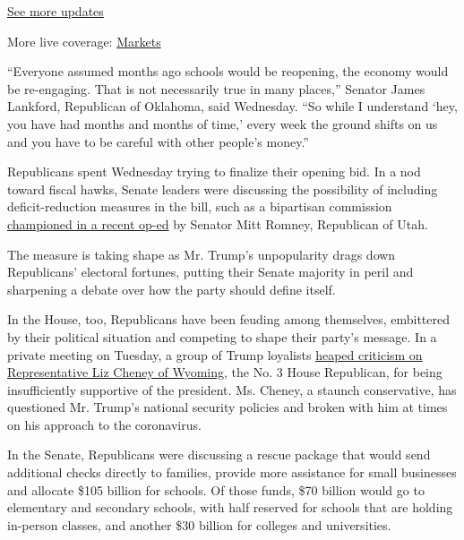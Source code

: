 \href{https://www.nytimes.com/2020/08/07/world/covid-19-news.html?action=click\&pgtype=Article\&state=default\&region=MAIN_CONTENT_1\&context=storylines_live_updates}{See
more updates}

More live coverage:
\href{https://www.nytimes.com/live/2020/08/07/business/stock-market-today-coronavirus?action=click\&pgtype=Article\&state=default\&region=MAIN_CONTENT_1\&context=storylines_live_updates}{Markets}

``Everyone assumed months ago schools would be reopening, the economy
would be re-engaging. That is not necessarily true in many places,''
Senator James Lankford, Republican of Oklahoma, said Wednesday. ``So
while I understand `hey, you have had months and months of time,' every
week the ground shifts on us and you have to be careful with other
people's money.''

Republicans spent Wednesday trying to finalize their opening bid. In a
nod toward fiscal hawks, Senate leaders were discussing the possibility
of including deficit-reduction measures in the bill, such as a
bipartisan commission
\href{https://www.deseret.com/opinion/2020/7/18/21327388/senator-mitt-romney-utah-covid-19-relief-cares-package-stimulus-business-national-debt-unemployment}{championed
in a recent op-ed} by Senator Mitt Romney, Republican of Utah.

The measure is taking shape as Mr. Trump's unpopularity drags down
Republicans' electoral fortunes, putting their Senate majority in peril
and sharpening a debate over how the party should define itself.

In the House, too, Republicans have been feuding among themselves,
embittered by their political situation and competing to shape their
party's message. In a private meeting on Tuesday, a group of Trump
loyalists
\href{https://www.nytimes.com/2020/07/21/us/politics/liz-cheney-house-republicans.html}{heaped
criticism on Representative Liz Cheney of Wyoming}, the No. 3 House
Republican, for being insufficiently supportive of the president. Ms.
Cheney, a staunch conservative, has questioned Mr. Trump's national
security policies and broken with him at times on his approach to the
coronavirus.

In the Senate, Republicans were discussing a rescue package that would
send additional checks directly to families, provide more assistance for
small businesses and allocate \$105 billion for schools. Of those funds,
\$70 billion would go to elementary and secondary schools, with half
reserved for schools that are holding in-person classes, and another
\$30 billion for colleges and universities.

